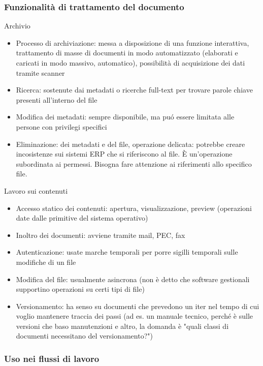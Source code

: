 \subsubsection{Funzionalit\`a di trattamento del
documento}

Archivio

\begin{itemize}

\item
  Processo di archiviazione: messa a disposizione di una funzione
  interattiva, trattamento di masse di documenti in modo automatizzato
  (elaborati e caricati in modo massivo, automatico), possibilit\`a di
  acquisizione dei dati tramite scanner
\item
  Ricerca: sostenute dai metadati o ricerche full-text per trovare
  parole chiave presenti all'interno del file
\item
  Modifica dei metadati: sempre disponibile, ma pu\'o essere limitata alle
  persone con privilegi specifici
\item
  Eliminazione: dei metadati e del file, operazione delicata: potrebbe
  creare incosistenze sui sistemi ERP che si riferiscono al file. È
  un'operazione subordinata ai permessi.
  Bisogna fare attenzione ai riferimenti allo specifico file.
\end{itemize}

Lavoro sui contenuti

\begin{itemize}

\item
  Accesso statico dei contenuti: apertura, visualizzazione, preview
  (operazioni date dalle primitive del sistema operativo)
\item
  Inoltro dei documenti: avviene tramite mail, PEC, fax
\item
  Autenticazione: usate marche temporali per porre sigilli temporali
  sulle modifiche di un file
\item
  Modifica del file: usualmente asincrona (non \`e detto che software
  gestionali supportino operazioni su certi tipi di file)
\item
  Versionamento: ha senso su documenti che prevedono un iter nel tempo
  di cui voglio mantenere traccia dei passi (ad es. un manuale tecnico,
  perch\'e \`e sulle versioni che baso manutenzioni e altro, la domanda \`e
  "quali classi di documenti necessitano del versionamento?")
\end{itemize}

\subsubsection{Uso nei flussi di lavoro}

